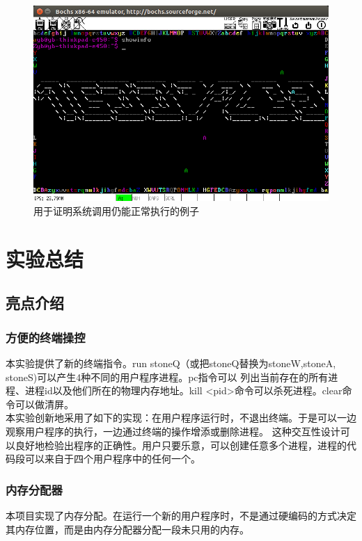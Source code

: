 \documentclass[a4paper]{article}
\begin{document}
    \begin{figure}
        \begin{center}
        \includegraphics[scale=0.5]{assets/int_still_work.png}
        \caption{用于证明系统调用仍能正常执行的例子\label{fig:null}} 
        \end{center} 
    \end{figure} 
    
\section{实验总结}
    \subsection{亮点介绍}
    \subsubsection{方便的终端操控}
    本实验提供了新的终端指令。run stoneQ（或把stoneQ替换为stoneW,stoneA, stoneS)可以产生4种不同的用户程序进程。pc指令可以
    列出当前存在的所有进程、进程id以及他们所在的物理内存地址。kill <pid>命令可以杀死进程。clear命令可以做清屏。\\ 

    本实验创新地采用了如下的实现：在用户程序运行时，不退出终端。于是可以一边观察用户程序的执行，一边通过终端的操作增添或删除进程。
    这种交互性设计可以良好地检验出程序的正确性。用户只要乐意，可以创建任意多个进程，进程的代码段可以来自于四个用户程序中的任何一个。
    \subsubsection{内存分配器}
    本项目实现了内存分配。在运行一个新的用户程序时，不是通过硬编码的方式决定其内存位置，而是由内存分配器分配一段未只用的内存。\\ 
\end{document}
